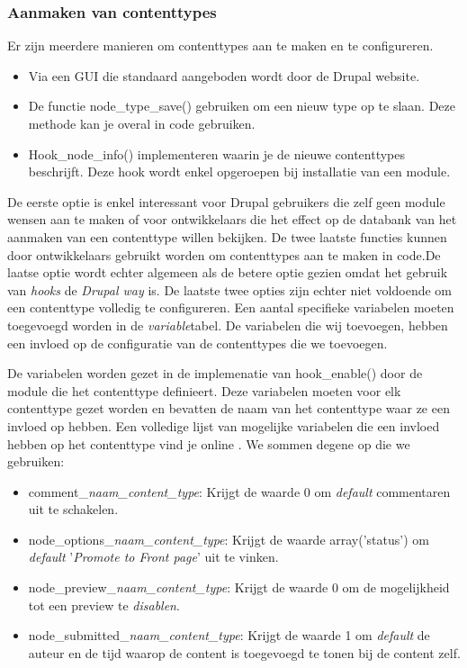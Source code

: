 \subsubsection{Aanmaken van contenttypes}
Er zijn meerdere manieren om contenttypes aan te maken en te configureren.
\begin{itemize}
\item Via een GUI die standaard aangeboden wordt door de Drupal website.
\item De functie node\_type\_save() gebruiken om een nieuw type op te slaan. Deze methode kan je overal in code gebruiken.
\item Hook\_node\_info() implementeren waarin je de nieuwe contenttypes beschrijft. Deze hook wordt enkel opgeroepen bij installatie van een module.
\end{itemize}
\noindent
De eerste optie is enkel interessant voor Drupal gebruikers die zelf geen module wensen aan te maken of voor ontwikkelaars die het effect op de databank van het aanmaken van een contenttype willen bekijken. De twee laatste functies kunnen door ontwikkelaars gebruikt worden om contenttypes aan te maken in code.De laatse optie wordt echter algemeen als de betere optie gezien omdat het gebruik van \textit{hooks} de \textit{Drupal way} is.
De laatste twee opties zijn echter niet voldoende om een contenttype volledig te configureren. Een aantal specifieke variabelen moeten toegevoegd worden in de \textit{variable}tabel. De variabelen die wij toevoegen, hebben een invloed op de configuratie van de contenttypes die we toevoegen.

De variabelen worden gezet in de implemenatie van hook\_enable() door de module die het contenttype definieert. Deze variabelen moeten voor elk contenttype gezet worden en bevatten de naam van het contenttype waar ze een invloed op hebben. Een volledige lijst van mogelijke variabelen die een invloed hebben op het contenttype vind je online \cite{contentTypeVariables}. We sommen degene op die we gebruiken:
\begin{itemize}
\item comment\_\textit{naam\_content\_type}: Krijgt de waarde 0 om \textit{default} commentaren uit te schakelen.
\item node\_options\_\textit{naam\_content\_type}: Krijgt de waarde array('status') om \textit{default} '\textit{Promote to Front page}' uit te vinken.
\item node\_preview\_\textit{naam\_content\_type}: Krijgt de waarde 0 om de mogelijkheid tot een preview te \textit{disablen}.
\item node\_submitted\_\textit{naam\_content\_type}: Krijgt de waarde 1 om \textit{default} de auteur en de tijd waarop de content is toegevoegd te tonen bij de content zelf.
\end{itemize}

